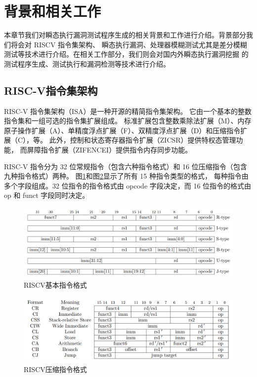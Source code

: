 \cleardoublepage

\section{背景和相关工作}

本章节我们对瞬态执行漏洞测试程序生成的相关背景和工作进行介绍。背景部分我们将会对 RISCV 指令集架构、
瞬态执行漏洞、处理器模糊测试尤其是差分模糊测试等技术进行介绍。在相关工作部分，我们则会对国内外瞬态执行漏洞挖掘
的测试程序生成、测试执行和漏洞检测等技术进行介绍。\par

\subsection{RISC-V指令集架构}

RISC-V 指令集架构（ISA）是一种开源的精简指令集架构\cite{riscv-isa-manual-all}。
它由一个基本的整数指令集和一组可选的指令集扩展组成。
标准扩展包含整数乘除法扩展（M）、内存原子操作扩展（A）、单精度浮点扩展（F）、双精度浮点扩展（D）和压缩指令扩展（C），等。
此外，控制和状态寄存器指令扩展（ZICSR）提供特权态管理功能， 而屏障指令扩展（ZIFENCEI）提供指令内存同步功能。\par

RISC-V 指令分为 32 位常规指令（包含六种指令格式）和 16 位压缩指令（包含九种指令格式）两种。 
图\ref{review:base-inst}和图\ref{review:compress-inst}显示了所有 15 种指令类型的格式，
每种指令由多个字段组成。32 位指令的指令格式由 opcode 字段决定，而 16 位指令的格式由 op 和 funct 字段同时决定。\par

\begin{figure}[!h]
    \centering
    \includegraphics[width=\linewidth]{figure/proposal/riscv-base-instruct-format.png}
    \caption{RISCV基本指令格式}
    \label{review:base-inst}
\end{figure}
\begin{figure}[!h]
    \centering
    \includegraphics[width=\linewidth]{figure/proposal/riscv-compress-instruct-format.png}
    \caption{RISCV压缩指令格式}
    \label{review:compress-inst}
\end{figure}

